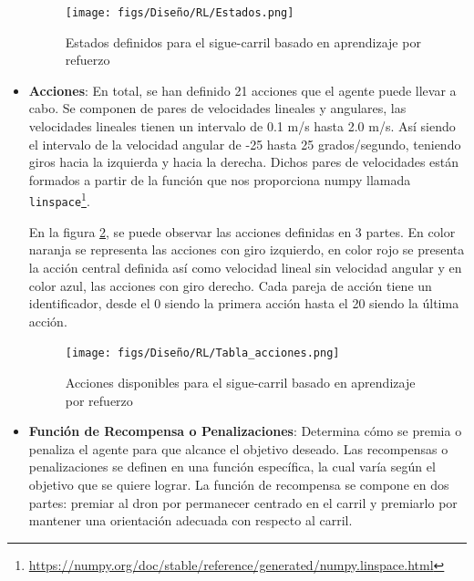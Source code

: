 \begin{itemize}
    \begin{figure} [H]
      \begin{center}
        \texttt{[image: figs/Diseño/RL/Estados.png]}
      \end{center}
      \caption{Estados definidos para el sigue-carril basado en aprendizaje por refuerzo}
      \label{fig:Estados}
      \vspace{-1.5em}
    \end{figure}

    \item \textbf{Acciones}: En total, se han definido 21 acciones que el agente puede llevar a cabo. Se componen de pares de velocidades lineales y angulares, las velocidades lineales
    tienen un intervalo de 0.1 m/s hasta 2.0 m/s. Así siendo el intervalo de la velocidad angular de -25 hasta 25 grados/segundo, teniendo giros hacia la izquierda y hacia la derecha. Dichos pares
    de velocidades están formados a partir de la función que nos proporciona numpy llamada \texttt{linspace}\footnote{\url{https://numpy.org/doc/stable/reference/generated/numpy.linspace.html}}. 

    En la figura \ref{fig:Acciones}, se puede observar las acciones definidas en 3 partes. En color naranja se representa las acciones con giro izquierdo, en color rojo se presenta 
    la acción central definida así como velocidad lineal sin velocidad angular y en color azul, las acciones con giro derecho. Cada pareja de acción tiene un identificador, desde el 0
    siendo la primera acción hasta el 20 siendo la última acción.
  
    \begin{figure} [H]
      \begin{center}
        \texttt{[image: figs/Diseño/RL/Tabla\_acciones.png]}
      \end{center}
      \caption{Acciones disponibles para el sigue-carril basado en aprendizaje por refuerzo}
      \label{fig:Acciones}
      \vspace{-1.5em}
    \end{figure}
  
    \item \textbf{Función de Recompensa o Penalizaciones}: Determina cómo se premia o penaliza el agente para que alcance el objetivo deseado. Las recompensas o penalizaciones
    se definen en una función específica, la cual varía según el objetivo que se quiere lograr. La función de recompensa se compone en dos partes: premiar al dron por permanecer 
    centrado en el carril y premiarlo por mantener una orientación adecuada con respecto al carril. 


\end{itemize}
